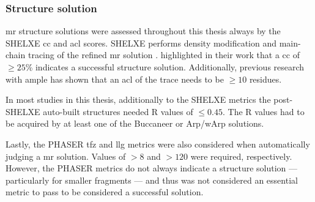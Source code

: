 \subsubsection{Structure solution}

\gls{mr} structure solutions were assessed throughout this thesis always by the SHELXE \gls{cc} and \gls{acl} scores. SHELXE performs density modification and main-chain tracing of the refined \gls{mr} solution \cite{Thorn2013-ir}. \textcite{Thorn2013-ir} highlighted in their work that a \gls{cc} of $\geq25$\% indicates a successful structure solution. Additionally, previous research with \gls{ample} \cite{Thomas2015-ag} has shown that an \gls{acl} of the trace needs to be $\geq10$ residues.

In most studies in this thesis, additionally to the SHELXE metrics the post-SHELXE auto-built structures needed R values of $\leq0.45$. The R values had to be acquired by at least one of the Buccaneer \cite{Cowtan2006-ue} or Arp/wArp \cite{Cohen2008-yx} solutions.

Lastly, the PHASER \gls{tfz} and \gls{llg} metrics were also considered when automatically judging a \gls{mr} solution. Values of $>8$ and $>120$ were required, respectively. However, the PHASER metrics do not always indicate a structure solution --- particularly for smaller fragments --- and thus was not considered an essential metric to pass to be considered a successful solution.
